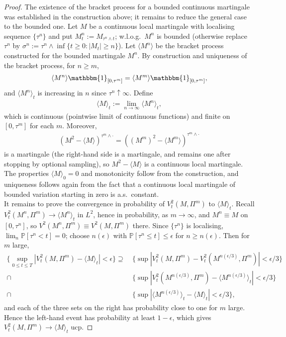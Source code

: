 \begin{proof}
	The existence of the bracket process for a bounded continuous martingale was established in the construction above; it remains to reduce the general case to the bounded one. Let $M$ be a continuous local martingale with localising sequence $\{\tau^n\}$ and put $M_t^n := M_{\tau^n \wedge t}$; w.l.o.g.\ $M^n$ is bounded (otherwise replace $\tau^n$ by $\sigma^n := \tau^n \wedge \inf\{t \ge 0 : |M_t| \ge n\}$). Let $\langle M^n \rangle$ be the bracket process constructed for the bounded martingale $M^n$. By construction and uniqueness of the bracket process, for $n \ge m$,
	\begin{align*}
		\langle M^n \rangle \mathbbm{1}_{[0, \tau^m]} = \langle M^m \rangle \mathbbm{1}_{[0, \tau^m]},
	\end{align*}
	and $\langle M^n \rangle_t$ is increasing in $n$ since $\tau^n \uparrow \infty$. Define
	\begin{align*}
		\langle M \rangle_t := \lim_{n \rightarrow \infty} \langle M^n \rangle_t,
	\end{align*}
	which is continuous (pointwise limit of continuous functions) and finite on $[0, \tau^m]$ for each $m$. Moreover,
	\begin{align*}
		(M^2 - \langle M \rangle)^{\tau^m \wedge \cdot} = ((M^m)^2 - \langle M^m \rangle)^{\tau^m \wedge \cdot}
	\end{align*}
	is a martingale (the right-hand side is a martingale, and remains one after stopping by optional sampling), so $M^2 - \langle M \rangle$ is a continuous local martingale. The properties $\langle M \rangle_0 = 0$ and monotonicity follow from the construction, and uniqueness follows again from the fact that a continuous local martingale of bounded variation starting in zero is a.s.\ constant.\\
	It remains to prove the convergence in probability of $V_t^2(M, \Pi^m)$ to $\langle M \rangle_t$. Recall $V_t^2(M^n, \Pi^m) \rightarrow \langle M^n \rangle_t$ in $L^2$, hence in probability, as $m \rightarrow \infty$, and $M^n \equiv M$ on $[0, \tau^n]$, so $V^2(M^n, \Pi^m) \equiv V^2(M, \Pi^m)$ there. Since $\{\tau^n\}$ is localising, $\lim_n \mathbb{P}[\tau^n < t] = 0$; choose $n(\epsilon)$ with $\mathbb{P}[\tau^n \le t] \le \epsilon$ for $n \ge n(\epsilon)$. Then for $m$ large,
	\begin{align*}
		\Big\{ \sup_{0 \le t \le T} |V_t^2(M, \Pi^m) - \langle M \rangle_t| < \epsilon \Big\}
		\supseteq\ &\Big\{ \sup |V_t^2(M, \Pi^m) - V_t^2(M^{n(\epsilon/3)}, \Pi^m)| < \epsilon/3 \Big\}\\
		\cap\ &\Big\{ \sup |V_t^2(M^{n(\epsilon/3)}, \Pi^m) - \langle M^{n(\epsilon/3)} \rangle_t| < \epsilon/3 \Big\}\\
		\cap\ &\Big\{ \sup |\langle M^{n(\epsilon/3)} \rangle_t - \langle M \rangle_t| < \epsilon/3 \Big\},
	\end{align*}
	and each of the three sets on the right has probability close to one for $m$ large. Hence the left-hand event has probability at least $1 - \epsilon$, which gives $V_t^2(M, \Pi^m) \rightarrow \langle M \rangle_t$ ucp.
\end{proof}


